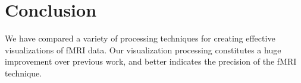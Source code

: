 
\section{Conclusion}

We have compared a variety of processing techniques for creating effective visualizations of fMRI data.  Our visualization processing constitutes a huge improvement over previous work, and better indicates the precision of the fMRI technique.